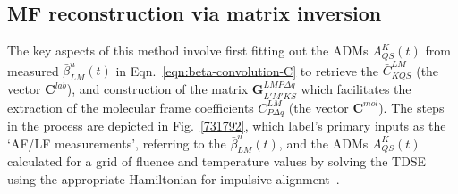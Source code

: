 \documentclass[10pt]{article}
\begin{document}

\subsection{MF reconstruction via matrix inversion\label{sec:Matrix-inversion-example}}

The key aspects of this method involve first fitting out the ADMs $A^K_{QS}(t)$ from measured $\bar{\beta}^u_{LM}(t)$ in Eqn.~\ref{eqn:beta-convolution-C} to retrieve the $\bar{C}^{LM}_{KQS}$ (the vector $\mathbf{C}^{lab}$), and construction of the matrix $\mathbf{{G}}^{LMP\Delta q }_{L'M'KS}$ which facilitates the extraction of the molecular frame coefficients $C^{LM}_{P\Delta q}$ (the vector $\mathbf{C}^{mol}$). The steps in the process are depicted in Fig.~\ref{731792}, which label's primary inputs as the `AF/LF measurements', referring to the $\bar{\beta}^u_{LM}(t)$, and the ADMs $A^K_{QS}(t)$ calculated for a grid of fluence and temperature values by solving the TDSE using the appropriate Hamiltonian for impulsive alignment~\cite{hasegawa2015NonadiabaticMolecularAlignment, koch2019QuantumControlMolecular}. 
\end{document}
